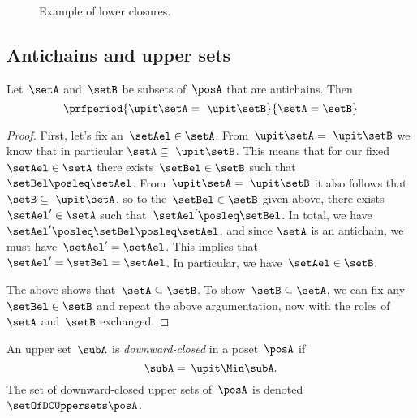 \begin{figure*}[h!]
    \centering
    \hfill
    \hfill
    \caption{Example of lower closures.}
    \label{fig:examplebatt}
\end{figure*}

\subsection{Antichains and upper sets}

\begin{lemma}
    \label{lem:up-cl-inj-antichains}
    Let~$\setA$ and~$\setB$ be subsets of~$\posA$ that are antichains.
    Then
    \begin{equation*}
        \prfperiod{\upit  \setA = \ \upit  \setB}{\setA = \setB}
    \end{equation*}
\end{lemma}

\begin{proof}
    First, let's fix an~$\setAel \in \setA$.
    From~$\upit  \setA = \ \upit  \setB$ we know that in particular $\setA \subseteq \ \upit  \setB$.
    This means that for our fixed~$\setAel \in \setA$ there exists~$\setBel \in \setB$ such that~$\setBel \posleq \setAel$.
    From~$\upit \setA = \ \upit  \setB$ it also follows that~$\setB \subseteq \ \upit  \setA$, so to the~$\setBel \in \setB$ given above, there exists~$\setAel' \in \setA$ such that~$\setAel' \posleq \setBel$.
    In total, we have~$\setAel' \posleq \setBel \posleq \setAel$, and since $\setA$ is an antichain, we must have~$\setAel' = \setAel$.
    This implies that~$\setAel' = \setBel = \setAel$.
    In particular, we have~$\setAel \in \setB$.

    The above shows that~$\setA \subseteq \setB$.
    To show~$\setB \subseteq \setA$, we can fix any~$\setBel \in \setB$ and repeat the above argumentation, now with the roles of~$\setA$ and~$\setB$ exchanged.
\end{proof}

\begin{definition}
    \label{def:downward-closed-upperset}
    An upper set~$\subA$ is \emph{downward-closed} in a poset~$\posA$ if
    \begin{equation}
        \subA =\, \upit  \Min \subA.
    \end{equation}
    The set of downward-closed upper sets of~$\posA$ is denoted~$\setOfDCUppersets \posA$.

\end{definition}

